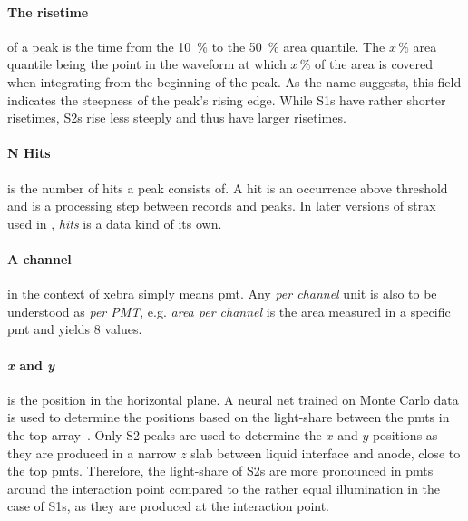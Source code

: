 \paragraph{The risetime} of a peak is the time from the \SI{10}{\%} to the \SI{50}{\%} area quantile.
The $ x\,\% $ area quantile being the point in the waveform at which $ x\,\% $ of the area is covered when integrating from the beginning of the peak.
As the name suggests, this field indicates the steepness of the peak's rising edge.
While S1s have rather shorter risetimes, S2s rise less steeply and thus have larger risetimes.

\paragraph{N Hits} is the number of hits a peak consists of.
A hit is an occurrence above threshold and is a processing step between records and peaks.
In later versions of strax used in \nton, \emph{hits} is a data kind of its own.

\paragraph{A channel} in the context of \gls{xebra} simply means \gls{pmt}.
Any \emph{per channel} unit is also to be understood as \emph{per PMT}, e.g. \emph{area per channel} is the area measured in a specific \gls{pmt} and yields 8 values.

\paragraph{\emph{x} and \emph{y}} is the position in the horizontal plane.
A neural net trained on Monte Carlo data is used to determine the positions based on the light-share between the \glspl{pmt} in the top array~\cite{ABism}.
Only S2 peaks are used to determine the $ x $ and $ y $ positions as they are produced in a narrow $ z $ slab between liquid interface and anode, close to the top \glspl{pmt}.
Therefore, the light-share of S2s are more pronounced in \glspl{pmt} around the interaction point compared to the rather equal illumination in the case of S1s, as they are produced at the interaction point.


